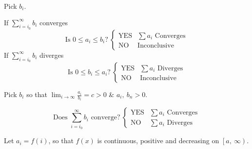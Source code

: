 \documentclass{article}
\theoremstyle{plain}
\numberwithin{theorem}{subsection}
\theoremstyle{definition}
\numberwithin{definition}{subsection}
\theoremstyle{remark}
\numberwithin{note}{subsection}
\begin{document}
\begin{multicols}{2}
\begin{mdframed}[style=exampledefaultcols,frametitle={Comparison Test}]
\begin{description}[style=sameline]
			\item[Conditions] Pick $b_i$.
		\end{description}
		\noindent If $\displaystyle \sum_{i=i_0}^\infty b_i$ converges
		\begin{equation*}
			\text{Is $0\leqslant a_i \leqslant b_i$?}\:
			\begin{cases}
				\text{YES} & \text{$\sum a_i$ Converges} \\
				\text{NO} & \text{Inconclusive}
			\end{cases}
		\end{equation*}
		If $\displaystyle \sum_{i=i_0}^\infty b_i$ diverges
		\begin{equation*}
			\text{Is $0\leqslant b_i \leqslant a_i$?}\:
			\begin{cases}
				\text{YES} & \text{$\sum a_i$ Diverges} \\
				\text{NO} & \text{Inconclusive}
			\end{cases}
		\end{equation*}
	\end{mdframed}
	\begin{mdframed}[style=exampledefaultcols,frametitle={Limit Comparison Test}]
		\begin{description}[style=sameline]
			\item[Conditions] Pick $b_i$ so that $\displaystyle \lim_{i\to\infty}\frac{a_i}{b_i}=c>0$ \& $a_i,\:b_n>0$.
		\end{description}
		\begin{equation*}
			\text{Does $\sum_{i=i_0}^\infty b_i$ converge?}\:
			\begin{cases}
				\text{YES} & \text{$\sum a_i$ Converges} \\
				\text{NO} & \text{$\sum a_i$ Diverges}
			\end{cases}
		\end{equation*}
	\end{mdframed}
	\begin{mdframed}[style=exampledefaultcols,frametitle={Integral Test}]
		\begin{description}[style=sameline]
			\item[Conditions] Let $a_i=f(i)$, so that $f(x)$ is continuous, positive and decreasing on $\left[a,\:\infty\right)$.
		\end{description}

\end{mdframed}
\end{multicols}
\end{document}
